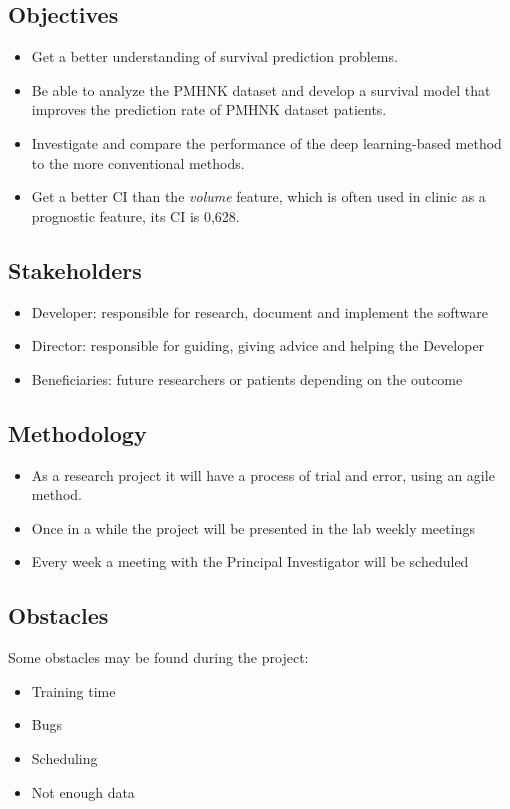 \subsection{Objectives}
\begin{frame}{\insertsubsec}
  \begin{itemize}
    \item Get a better understanding of survival prediction problems.
    \item Be able to analyze the PMHNK dataset and develop a survival model that improves the 
    prediction rate of PMHNK dataset patients.
    \item Investigate and compare the performance of the deep learning-based method to 
    the more conventional methods.
    \item Get a better CI than the \emph{volume} feature, which is often used in clinic as a
    prognostic feature, its CI is 0,628.
  \end{itemize}
\end{frame}

\subsection{Stakeholders}
\begin{frame}{\insertsubsec}
  \begin{itemize}
    \item Developer: responsible for research, document and implement the software
    \item Director: responsible for guiding, giving advice and helping the Developer
    \item Beneficiaries: future researchers or patients depending on the outcome
  \end{itemize}
\end{frame}

\subsection{Methodology}
\begin{frame}{\insertsubsec}
  \begin{itemize}
    \item As a research project it will have a process of trial and error, using an agile method.
    \item Once in a while the project will be presented in the lab weekly meetings
    \item Every week a meeting with the Principal Investigator will be scheduled
  \end{itemize}
\end{frame}

\subsection{Obstacles}
\begin{frame}{\insertsubsec}
  Some obstacles may be found during the project:

  \begin{itemize}
    \item Training time
    \item Bugs
    \item Scheduling
    \item Not enough data
  \end{itemize}
\end{frame}

